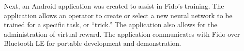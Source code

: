 Next, an Android application was created to assist in Fido's training.
The application allows an operator to create or select a new neural network to be trained for a specific task, or ``trick.''  The application also allows for the administration of virtual reward.
The application communicates with Fido over Bluetooth LE for portable development and demonstration.
